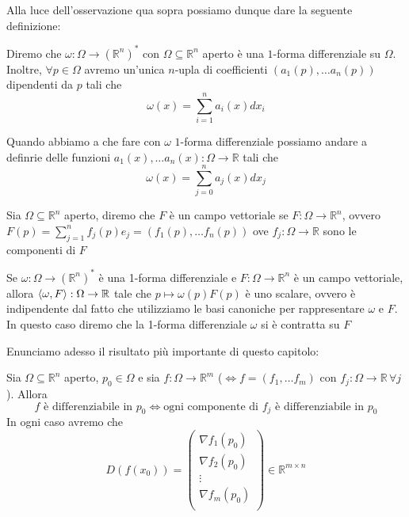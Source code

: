 Alla luce dell'osservazione qua sopra possiamo dunque dare la seguente definizione:

\vspace{0.5cm}
\begin{definition}[\textcolor{blue}{1-forma differenziale}]
Diremo che $\omega: \Omega \to (\mathbb{R}^n)^{*}$ con $\Omega \subseteq \mathbb{R}^n$ aperto è una $1$-forma differenziale su $\Omega$. Inoltre, $\forall p \in \Omega$ avremo un'unica $n$-upla di coefficienti $(a_1(p), \ldots a_n(p))$ dipendenti da $p$ tali che
$$
\omega(x) = \sum_{i=1}^n a_i(x)dx_i
$$
\end{definition}

\begin{remark}
\noindent Quando abbiamo a che fare con $\omega$ $1$-forma differenziale possiamo andare a definrie delle funzioni $a_1(x), \ldots a_n(x): \Omega \to \mathbb{R}$ tali che
$$
\omega(x) = \sum_{j=0}^n a_j(x)dx_j
$$
\end{remark}

\vspace{0.5cm}
\begin{definition}[\textcolor{blue}{campo vettoriale}]
Sia $\Omega \subseteq \mathbb{R}^n$ aperto, diremo che $F$ è un campo vettoriale se $F: \Omega \to \mathbb{R}^n$, ovvero $F(p) = \sum\limits_{j=1}^n f_j(p)e_j = (f_1(p), \ldots f_n(p))$ ove $f_j: \Omega \to \mathbb{R}$ sono le componenti di $F$
\end{definition}

\begin{remark}
Se $\omega: \Omega \to (\mathbb{R}^n)^{*}$ è una 1-forma differenziale e $F: \Omega \to \mathbb{R}^n$ è un campo vettoriale, allora $\langle \omega, F \rangle: \Omega \to \mathbb{R}$ tale che $p \mapsto \omega(p)F(p)$ è uno scalare, ovvero è indipendente dal fatto che utilizziamo le basi canoniche per rappresentare $\omega$ e $F$. In questo caso diremo che la 1-forma differenziale $\omega$ si è contratta su $F$
\end{remark}

Enunciamo adesso il risultato più importante di questo capitolo:

\begin{theorem}
Sia $\Omega \subseteq \mathbb{R}^n$ aperto, $p_0 \in \Omega$ e sia $f: \Omega \to \mathbb{R}^m$ ($\iff f=(f_1, \ldots f_m)$ con $f_j: \Omega \to \mathbb{R} \, \forall j$). Allora 
$$
f \text{ è differenziabile in } p_0 \iff \text{ogni componente di } f_j \text{ è differenziabile in } p_0
$$
In ogni caso avremo che
$$
D(f(x_0)) = \begin{pmatrix}
\nabla{f_1(p_0)} \\
\nabla{f_2(p_0)} \\
\vdots \\
\nabla{f_m(p_0)} \\
\end{pmatrix} \in \mathbb{R}^{m \times n}
$$
\end{theorem}

